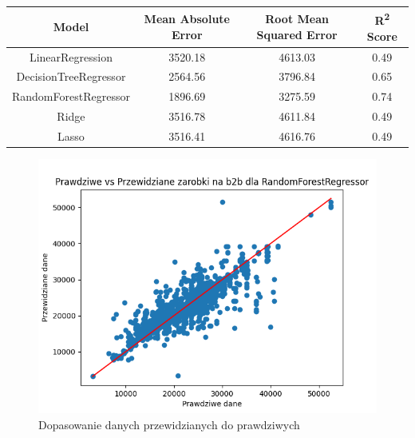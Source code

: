 \documentclass[a4paper]{article}
\begin{document}
\begin{table}[H]
    \centering
    \begin{tabular}{|c|c|c|c|}
        \hline
        \textbf{Model}        & \textbf{Mean Absolute Error} & \textbf{Root Mean Squared Error} & \textbf{R\textsuperscript{2} Score} \\ \hline
        LinearRegression      & 3520.18                      & 4613.03                          & 0.49                                \\ \hline
        DecisionTreeRegressor & 2564.56                      & 3796.84                          & 0.65                                \\ \hline
        RandomForestRegressor & 1896.69                      & 3275.59                          & 0.74                                \\ \hline
        Ridge                 & 3516.78                      & 4611.84                          & 0.49                                \\ \hline
        Lasso                 & 3516.41                      & 4616.76                          & 0.49                                \\ \hline
    \end{tabular}
\end{table}

\begin{figure}[H]
    \centering
    \includegraphics[width=\textwidth]{../analysis/plots/wyniki/0.6&0.4/b2b/RandomForestRegressor/scatter.png}
    \caption{Dopasowanie danych przewidzianych do prawdziwych}
\end{figure}
\end{document}

